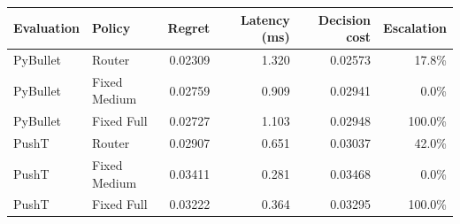 \begin{tabular}{llrrrr}
\toprule
Evaluation & Policy & Regret & Latency (ms) & Decision cost & Escalation \\
\midrule
PyBullet & Router & 0.02309 & 1.320 & 0.02573 & 17.8\% \\
PyBullet & Fixed Medium & 0.02759 & 0.909 & 0.02941 & 0.0\% \\
PyBullet & Fixed Full & 0.02727 & 1.103 & 0.02948 & 100.0\% \\
PushT & Router & 0.02907 & 0.651 & 0.03037 & 42.0\% \\
PushT & Fixed Medium & 0.03411 & 0.281 & 0.03468 & 0.0\% \\
PushT & Fixed Full & 0.03222 & 0.364 & 0.03295 & 100.0\% \\
\bottomrule
\end{tabular}
